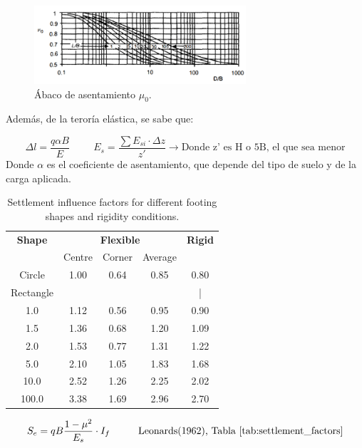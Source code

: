 \documentclass{article} %
\begin{document}
\begin{figure}[h]
    \centering
    \includegraphics[width=0.7\textwidth]{Graficos/asentamiento_4.PNG}
    \caption{Ábaco de asentamiento $\mu_0$.}
    \label{fig:asentamiento4}    
\end{figure}

Además, de la teroría elástica, se sabe que:

\[
\Delta l = \frac{q \alpha B}{E} \hspace{1cm} E_s = \frac{\sum E_{si}\cdot \Delta z}{z'} \rightarrow \text{Donde z' es H o 5B, el que sea menor}
\]
Donde $\alpha$ es el coeficiente de asentamiento, que depende del tipo de suelo y de la carga aplicada.\\

\begin{table}[H]
\centering
\begin{tabular}{|c|ccc|c|}
\hline
\textbf{Shape} & \multicolumn{3}{c|}{\textbf{Flexible}} & \textbf{Rigid} \\
\cline{2-4}
 & Centre & Corner & Average & \\ 
\hline
Circle    & 1.00 & 0.64 & 0.85 & 0.80 \\
\hline
Rectangle & & & & |\\
\hline
1.0       & 1.12 & 0.56 & 0.95 & 0.90 \\
1.5       & 1.36 & 0.68 & 1.20 & 1.09 \\
2.0       & 1.53 & 0.77 & 1.31 & 1.22 \\
5.0       & 2.10 & 1.05 & 1.83 & 1.68 \\
10.0      & 2.52 & 1.26 & 2.25 & 2.02 \\
100.0     & 3.38 & 1.69 & 2.96 & 2.70 \\
\hline
\end{tabular}
\caption{Settlement influence factors for different footing shapes and rigidity conditions.}
\label{tab:settlement_factors}
\end{table}

\[
S_e = q B \frac{1 - \mu^2}{E_s} \cdot I_f \hspace{1cm} \text{Leonards(1962), Tabla \ref{tab:settlement_factors}}
\]
\end{document}
